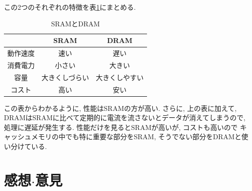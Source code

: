 \documentclass[titlepage]{jsarticle}
\begin{document}
  この2つのそれぞれの特徴を表\ref{tab:SRAM_and_DRAM}にまとめる.

  \begin{table}[h]
    \centering
    \caption{SRAMとDRAM}
    \label{tab:SRAM_and_DRAM}
    \begin{tabular}{c|cc}
      & SRAM & DRAM \\ \hline
      動作速度 & 速い & 遅い \\
      消費電力 & 小さい & 大きい \\
      容量 & 大きくしづらい & 大きくしやすい \\
      コスト & 高い & 安い \\
    \end{tabular}
  \end{table}

  この表からわかるように, 性能はSRAMの方が高い.
  さらに, 上の表に加えて, DRAMはSRAMに比べて定期的に電流を流さないとデータが消えてしまうので,
  処理に遅延が発生する.
  性能だけを見るとSRAMが高いが, コストも高いので
  キャッシュメモリの中でも特に重要な部分をSRAM, そうでない部分をDRAMと使い分けている.
\section{感想$\cdot$意見}

\begin{thebibliography}{9}
\end{thebibliography}
\end{document}
